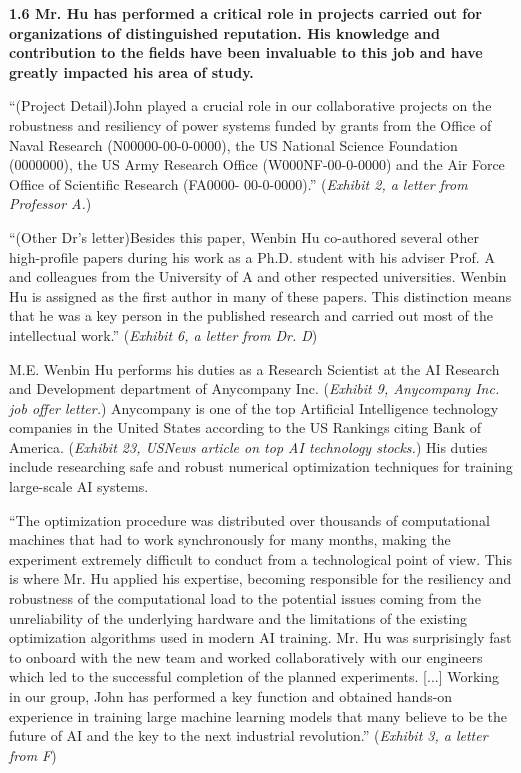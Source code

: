 \documentclass{article}
\begin{document}
{\bf 1.6 Mr. Hu has performed a critical role in projects carried out for organizations of distinguished reputation. His knowledge and contribution to the fields have been invaluable to this job and have greatly impacted his area of study. }

“(Project Detail)John played a crucial role in our collaborative projects on the robustness and resiliency of power systems funded by grants from the Office of Naval Research (N00000-00-0-0000), the US National Science Foundation (0000000), the US Army Research Office (W000NF-00-0-0000) and the Air Force Office of Scientific Research (FA0000- 00-0-0000).” ({\it Exhibit 2, a letter from Professor A.}) 

“(Other Dr's letter)Besides this paper, Wenbin Hu co-authored several other high-profile papers during his work as a Ph.D. student with his adviser Prof. A and colleagues from the University of A and other respected universities. Wenbin Hu is assigned as the first author in many of these papers. This distinction means that he was a key person in the published research and carried out most of the intellectual work.” ({\it Exhibit 6, a letter from Dr. D}) 

M.E. Wenbin Hu performs his duties as a Research Scientist at the AI Research and Development department of Anycompany Inc. ({\it Exhibit 9, Anycompany Inc. job offer letter.}) Anycompany is one of the top Artificial Intelligence technology companies in the United States according to the US Rankings citing Bank of America. ({\it Exhibit 23, USNews article on top AI technology stocks.}) His duties include researching safe and robust numerical optimization techniques for training large-scale AI systems.

“The optimization procedure was distributed over thousands of computational machines that had to work synchronously for many months, making the experiment extremely difficult to conduct from a technological point of view. This is where Mr. Hu applied his expertise, becoming responsible for the resiliency and robustness of the computational load to the potential issues coming from the unreliability of the underlying hardware and the limitations of the existing optimization algorithms used in modern AI training. Mr. Hu was surprisingly fast to onboard with the new team and worked collaboratively with our engineers which led to the successful completion of the planned experiments. [...] Working in our group, John has performed a key function and obtained hands-on experience in training large machine learning models that many believe to be the future of AI and the key to the next industrial revolution.” ({\it Exhibit 3, a letter from F}) 
\end{document}
